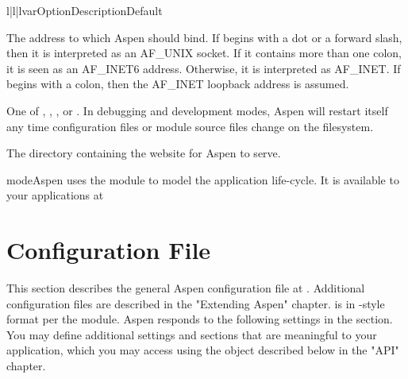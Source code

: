 \begin{tableiii}{l|l|l}{var}{Option}{Description}{Default}

    {The address to which Aspen should bind. If  begins with a dot
    or a forward slash, then it is interpreted as an AF_UNIX socket. If it
    contains more than one colon, it is seen as an AF_INET6 address. Otherwise,
    it is interpreted as AF_INET. If  begins with a colon, then the
    AF_INET loopback address is assumed.} {}


    {One of , , , or
    . In debugging and development modes, Aspen will restart
    itself any time configuration files or module source files change on the
    filesystem.}
    {}

    {The directory containing the website for Aspen to serve.}
    {}


\end{tableiii}

\begin{seealso}

{mode}{Aspen uses the  module to model the application life-cycle.
It is available to your applications at }

\end{seealso}


\section{Configuration File \label{config-file}}

This section describes the general Aspen configuration file at
. Additional configuration files are described in the
"Extending Aspen" chapter.  is in -style format per
the  module. Aspen responds to the following settings in
the  section. You may define additional settings and sections that
are meaningful to your application, which you may access using the
 object described below in the "API" chapter.

